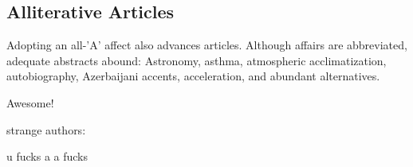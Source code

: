 \documentclass[twocolumn]{article}
\begin{document}
\subsection{Alliterative Articles}

Adopting an all-'A' affect also advances articles. Although affairs
are abbreviated, adequate abstracts abound: Astronomy, asthma,
atmospheric acclimatization, autobiography, Azerbaijani accents,
acceleration, and abundant alternatives.


Awesome!

strange authors:

u fucks
a a fucks




\end{document}
